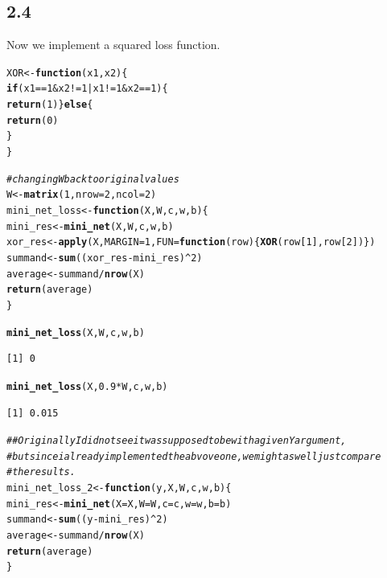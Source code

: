\documentclass[10pt, a4paper, english]{article}\usepackage[]{graphicx}\usepackage[dvipsnames]{xcolor}
\makeatletter
\newcommand{\hlnum}[1]{\textcolor[rgb]{0.686,0.059,0.569}{#1}}%
\newcommand{\hlcom}[1]{\textcolor[rgb]{0.678,0.584,0.686}{\textit{#1}}}%
\newcommand{\hlopt}[1]{\textcolor[rgb]{0,0,0}{#1}}%
\newcommand{\hlstd}[1]{\textcolor[rgb]{0.345,0.345,0.345}{#1}}%
\newcommand{\hlkwa}[1]{\textcolor[rgb]{0.161,0.373,0.58}{\textbf{#1}}}%
\newcommand{\hlkwb}[1]{\textcolor[rgb]{0.69,0.353,0.396}{#1}}%
\newcommand{\hlkwc}[1]{\textcolor[rgb]{0.333,0.667,0.333}{#1}}%
\newcommand{\hlkwd}[1]{\textcolor[rgb]{0.737,0.353,0.396}{\textbf{#1}}}%
\newenvironment{kframe}{%
 \def\at@end@of@kframe{}%
 \ifinner\ifhmode%
  \def\at@end@of@kframe{\end{minipage}}%
  \begin{minipage}{\columnwidth}%
 \fi\fi%
 \def\FrameCommand##1{\hskip\@totalleftmargin \hskip-\fboxsep
 \colorbox{shadecolor}{##1}\hskip-\fboxsep
     \hskip-\linewidth \hskip-\@totalleftmargin \hskip\columnwidth}%
 \MakeFramed {\advance\hsize-\width
   \@totalleftmargin\z@ \linewidth\hsize
   \@setminipage}}%
 {\par\unskip\endMakeFramed%
 \at@end@of@kframe}
\newenvironment{knitrout}{}{} %
\makeatother
\begin{document}
 \subsection{2.4}
 Now we implement a squared loss function.
\begin{knitrout}
\color{fgcolor}\begin{kframe}
\begin{alltt}
\hlstd{XOR} \hlkwb{<-} \hlkwa{function}\hlstd{(}\hlkwc{x1}\hlstd{,} \hlkwc{x2}\hlstd{)\{}
  \hlkwa{if}\hlstd{(x1} \hlopt{==}\hlnum{1} \hlopt{&} \hlstd{x2}\hlopt{!=}\hlnum{1} \hlopt{|} \hlstd{x1}\hlopt{!=} \hlnum{1} \hlopt{&} \hlstd{x2} \hlopt{==}\hlnum{1}\hlstd{)\{}
  \hlkwd{return}\hlstd{(}\hlnum{1}\hlstd{)\}} \hlkwa{else}\hlstd{\{}
    \hlkwd{return}\hlstd{(}\hlnum{0}\hlstd{)}
  \hlstd{\}}
\hlstd{\}}

\hlcom{#changing W back to original values }
\hlstd{W} \hlkwb{<-} \hlkwd{matrix}\hlstd{(}\hlnum{1}\hlstd{,} \hlkwc{nrow} \hlstd{=} \hlnum{2}\hlstd{,} \hlkwc{ncol} \hlstd{=} \hlnum{2}\hlstd{)}
\hlstd{mini_net_loss} \hlkwb{<-} \hlkwa{function}\hlstd{(}\hlkwc{X}\hlstd{,} \hlkwc{W}\hlstd{,} \hlkwc{c}\hlstd{,} \hlkwc{w}\hlstd{,} \hlkwc{b}\hlstd{)\{}
  \hlstd{mini_res} \hlkwb{<-} \hlkwd{mini_net}\hlstd{(X, W, c, w, b)}
\hlstd{xor_res} \hlkwb{<-} \hlkwd{apply}\hlstd{(X,} \hlkwc{MARGIN}\hlstd{=}\hlnum{1}\hlstd{,} \hlkwc{FUN}\hlstd{=}\hlkwa{function}\hlstd{(}\hlkwc{row}\hlstd{)\{} \hlkwd{XOR}\hlstd{(row[}\hlnum{1}\hlstd{], row[}\hlnum{2}\hlstd{])\})}
\hlstd{summand} \hlkwb{<-} \hlkwd{sum}\hlstd{((xor_res} \hlopt{-}\hlstd{mini_res)}\hlopt{^}\hlnum{2}\hlstd{)}
\hlstd{average} \hlkwb{<-} \hlstd{summand} \hlopt{/} \hlkwd{nrow}\hlstd{(X)}
\hlkwd{return}\hlstd{(average)}
\hlstd{\}}

\hlkwd{mini_net_loss}\hlstd{(X, W, c, w, b)}
\end{alltt}
\begin{verbatim}
[1] 0
\end{verbatim}
\begin{alltt}
\hlkwd{mini_net_loss}\hlstd{(X,} \hlnum{0.9}\hlopt{*}\hlstd{W, c, w, b)}
\end{alltt}
\begin{verbatim}
[1] 0.015
\end{verbatim}
\begin{alltt}
\hlcom{## Originally I did not see it was supposed to be with a given Y argument,}
\hlcom{#but since i already implemented the abvove one, we might as well just compare }
\hlcom{#the results. }
\hlstd{mini_net_loss_2}\hlkwb{<-} \hlkwa{function}\hlstd{(}\hlkwc{y}\hlstd{,} \hlkwc{X}\hlstd{,} \hlkwc{W}\hlstd{,} \hlkwc{c}\hlstd{,} \hlkwc{w}\hlstd{,} \hlkwc{b}\hlstd{)\{}
  \hlstd{mini_res} \hlkwb{<-} \hlkwd{mini_net}\hlstd{(}\hlkwc{X}\hlstd{=X,} \hlkwc{W}\hlstd{=W,} \hlkwc{c}\hlstd{=c,} \hlkwc{w}\hlstd{=w,} \hlkwc{b}\hlstd{=b)}
  \hlstd{summand} \hlkwb{<-} \hlkwd{sum}\hlstd{((y}\hlopt{-}\hlstd{mini_res)}\hlopt{^}\hlnum{2}\hlstd{)}
  \hlstd{average} \hlkwb{<-} \hlstd{summand}\hlopt{/}\hlkwd{nrow}\hlstd{(X)}
  \hlkwd{return}\hlstd{(average)}
\hlstd{\}}


\end{alltt}
\end{kframe}
\end{knitrout}
\end{document}
